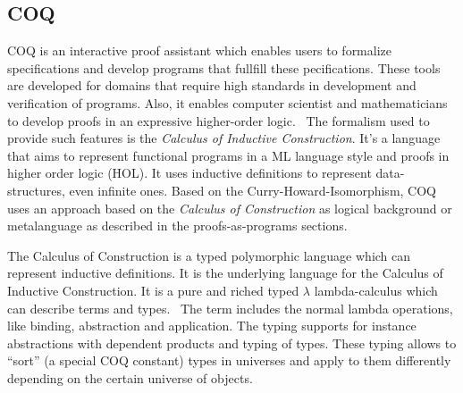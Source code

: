 




\subsection{COQ}
COQ is an interactive proof assistant which enables users to formalize
specifications and develop programs that fullfill these pecifications.
These tools are developed for domains that require high standards in
development and verification of programs. Also, it enables computer
scientist and mathematicians to develop proofs in an expressive
higher-order logic.~\cite{the_coq_development_team_2019_2554024}
The formalism used to provide such features is the \textit{Calculus of Inductive
  Construction}. It's a language that aims to represent functional programs
in a ML language style and proofs in higher order logic (HOL).
It uses inductive definitions to represent data-structures, even infinite
ones. Based on the Curry-Howard-Isomorphism, COQ uses an approach based
on the \textit{Calculus of Construction} as logical
background or metalanguage as described in the proofs-as-programs sections.~\cite{the_coq_development_team_2019_2554024, paulinmohring:hal-01094195}

The Calculus of Construction is a typed polymorphic language which can
represent inductive definitions. It is the underlying language for the
Calculus of Inductive Construction. It is a pure and riched typed $\lambda$
lambda-calculus which can describe terms and types.~\cite{paulinmohring:hal-01094195}
The term includes the normal lambda operations, like binding, abstraction
and application. The typing supports for instance  abstractions with
dependent products and typing of types. These typing allows to ``sort''
(a special COQ constant) types in universes and apply to them differently
depending on the certain universe of objects.~\cite{paulinmohring:hal-01094195}


